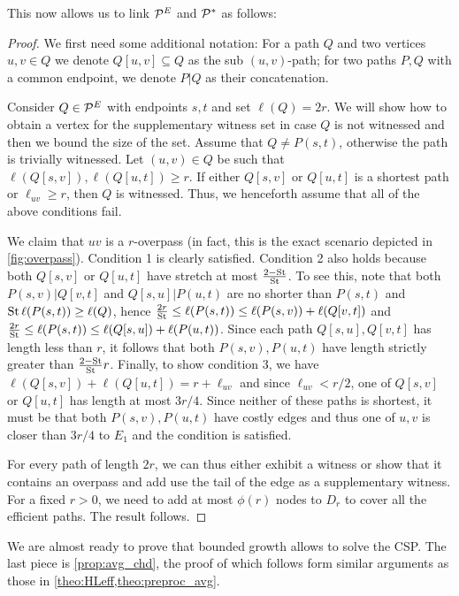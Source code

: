This now allows us to link $\mathcal{P}^E$ and $\mathcal{P}^*$ as follows:
\begin{proof}
We first need some additional notation:
For a path $Q$ and two vertices $u,v\in Q$ we denote $Q[u,v]\subseteq Q$ as the sub $(u,v)$-path; for two paths $P,Q$ with a common endpoint, we denote $P|Q$ as their concatenation.

Consider $Q\in\mathcal{P}^E$ with endpoints $s,t$ and set $\ell(Q)=2r$.
We will show how to obtain a vertex for the supplementary witness set in case $Q$ is not witnessed and then we bound the size of the set.
Assume that $Q\neq P(s,t)$, otherwise the path is trivially witnessed.
Let $(u,v)\in Q$ be such that $\ell(Q[s,v]),\ell(Q[u,t])\geq r$. 
If either $Q[s,v]$ or $Q[u,t]$ is a shortest path or $\ell_{uv}\geq r$, then $Q$ is witnessed. Thus, we henceforth assume that all of the above conditions fail.

We claim that $uv$ is a $r$-overpass (in fact, this is the exact scenario depicted in \cref{fig:overpass}).
Condition 1 is clearly satisfied. 
Condition 2 also holds because both $Q[s,v]$ or $Q[u,t]$ have stretch at most $\frac{2-\operatorname{St}}{\operatorname{St}}$.
To see this, note that both $P(s,v)|Q[v,t]$ and $Q[s,u]|P(u,t)$ are no shorter than $P(s,t)$ and $\operatorname{St}\ell(P(s,t))\geq \ell(Q)$, hence
$\frac{2r}{\operatorname{St}}\leq \ell(P(s,t)) \leq  \ell(P(s,v)) + \ell(Q[v,t])$ and $\frac{2r}{\operatorname{St}} \leq \ell(P(s,t)) \leq  \ell(Q[s,u]) + \ell(P(u,t))$.
Since each path $Q[s,u],Q[v,t]$ has length less than $r$, it follows that both $P(s,v),P(u,t)$ have length strictly greater than $\frac{2-\operatorname{St}}{\operatorname{St}}r$. %
Finally, to show condition 3, we have $\ell(Q[s,v])+\ell(Q[u,t])=r+\ell_{uv}$ and since $\ell_{uv}<r/2$, one of $Q[s,v]$ or $Q[u,t]$ has length at most $3r/4$.
Since neither of these paths is shortest, it must be that both $P(s,v),P(u,t)$ have costly edges and thus one of $u,v$ is closer than $3r/4$ to $E_1$ and the condition is satisfied.

For every path of length $2r$, we can thus either exhibit a witness or show that it contains an overpass and add use the tail of the edge as a supplementary witness.
For a fixed $r>0$, we need to add at most $\phi(r)$ nodes to $D_r$ to cover all the efficient paths. 
The result follows.
\end{proof}

We are almost ready to prove that bounded growth allows to solve the CSP.
The last piece is \cref{prop:avg_chd}, the proof of which follows form similar arguments as those in \cref{theo:HLeff,theo:preproc_avg}.

